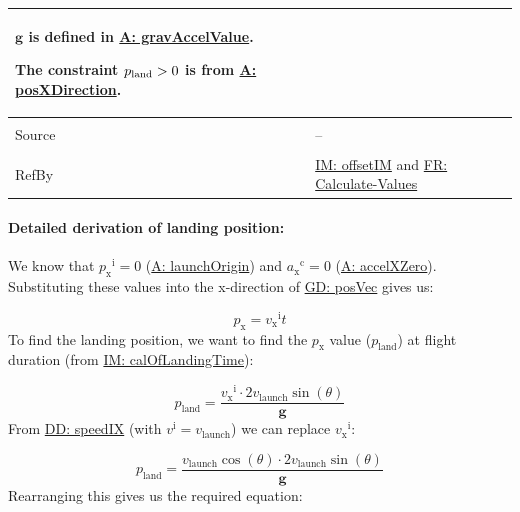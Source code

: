 \documentclass[12pt]{article}
\newcommand{\gt}{\ensuremath >}
\begin{document}
\begin{minipage}{\textwidth}
\begin{tabular}{>{\raggedright}p{}>{\raggedright\arraybackslash}p{}}
        $\mathbf{g}$ is defined in \hyperref[gravAccelValue]{A: gravAccelValue}.
        
        The constraint ${p_{\text{land}}}\gt{}0$ is from \hyperref[posXDirection]{A: posXDirection}.
        
\\ \midrule \\
Source & --
         
\\ \midrule \\
RefBy & \hyperref[IM:offsetIM]{IM: offsetIM} and \hyperref[calcValues]{FR: Calculate-Values}
        
\\ \bottomrule
\end{tabular}
\end{minipage}
\paragraph{Detailed derivation of landing position:}
\label{IM:calOfLandingDistDeriv}
We know that ${{p_{\text{x}}}^{\text{i}}}=0$ (\hyperref[launchOrigin]{A: launchOrigin}) and ${{a_{\text{x}}}^{\text{c}}}=0$ (\hyperref[accelXZero]{A: accelXZero}). Substituting these values into the x-direction of \hyperref[GD:posVec]{GD: posVec} gives us:

\begin{displaymath}
{p_{\text{x}}}={{v_{\text{x}}}^{\text{i}}} t
\end{displaymath}
To find the landing position, we want to find the ${p_{\text{x}}}$ value (${p_{\text{land}}}$) at flight duration (from \hyperref[IM:calOfLandingTime]{IM: calOfLandingTime}):

\begin{displaymath}
{p_{\text{land}}}=\frac{{{v_{\text{x}}}^{\text{i}}}\cdot{}2 {v_{\text{launch}}} \sin\left(θ\right)}{\mathbf{g}}
\end{displaymath}
From \hyperref[DD:speedIX]{DD: speedIX} (with ${v^{\text{i}}}={v_{\text{launch}}}$) we can replace ${{v_{\text{x}}}^{\text{i}}}$:

\begin{displaymath}
{p_{\text{land}}}=\frac{{v_{\text{launch}}} \cos\left(θ\right)\cdot{}2 {v_{\text{launch}}} \sin\left(θ\right)}{\mathbf{g}}
\end{displaymath}
Rearranging this gives us the required equation:
\end{document}

